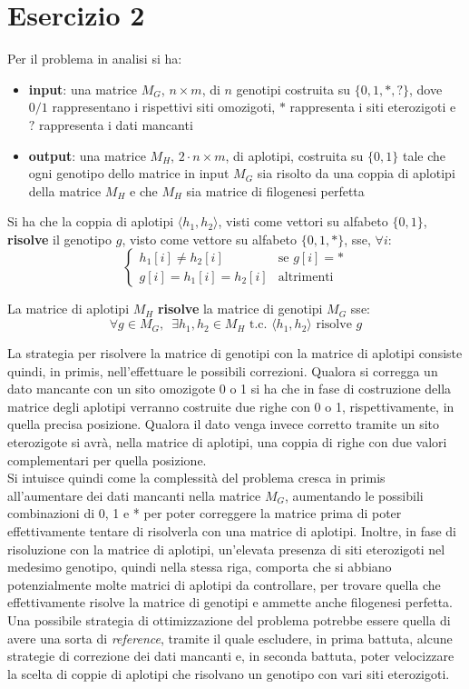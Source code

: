\documentclass[a4paper,12pt, oneside]{book}
\begin{document}
\chapter{Esercizio 2}
Per il problema in analisi si ha:
\begin{itemize}
  \item \textbf{input}: una matrice $M_G$, $n\times m$, di $n$ genotipi
  costruita su $\{0,1,*,?\}$, dove $0/1$ rappresentano i rispettivi siti
  omozigoti, $*$ rappresenta i siti eterozigoti e $?$ rappresenta i dati
  mancanti 
  \item \textbf{output}: una matrice $M_H$, $2\cdot n\times m$, di aplotipi,
  costruita 
  su $\{0,1\}$ tale che ogni genotipo dello matrice in input $M_G$ sia risolto
  da una coppia di aplotipi della matrice $M_H$ e che $M_H$ sia matrice di
  filogenesi perfetta
\end{itemize}
\begin{definizione}
  Si ha che la coppia di aplotipi $\langle h_1,h_2\rangle$, visti come
  vettori su alfabeto $\{0,1\}$, \textbf{risolve} il
  genotipo $g$, visto come vettore su alfabeto $\{0,1,*\}$, sse, $\forall i$:
  \[
    \begin{cases}
      h_1[i]\neq h_2[i]&\mbox{se } g[i]=*\\
      g[i]=h_1[i]=h_2[i]&\mbox{altrimenti}
    \end{cases}
  \]
\end{definizione}
\begin{definizione}
  La matrice di aplotipi $M_H$ \textbf{risolve} la matrice di genotipi $M_G$
  sse:
  \[\forall g\in M_G,\,\,\,\exists h_1,h_2\in
    M_H\mbox{ t.c. }\langle h_1,h_2\rangle \mbox{ risolve } g\]
\end{definizione}
La strategia per risolvere la matrice di genotipi con la matrice di aplotipi
consiste quindi, in primis, nell'effettuare le possibili correzioni. Qualora si
corregga un dato mancante con un sito omozigote 0 o 1 si ha che in fase di
costruzione della matrice degli aplotipi verranno costruite due righe con 0 o 1,
rispettivamente, in quella precisa posizione. Qualora il dato venga invece
corretto tramite un sito eterozigote si avrà, nella matrice di aplotipi, una
coppia di righe con due valori complementari per quella posizione.\\
Si intuisce quindi come la complessità del problema cresca in primis
all'aumentare dei dati mancanti nella matrice $M_G$, aumentando le possibili
combinazioni di 0, 1 e * per poter correggere la matrice prima di poter
effettivamente tentare di risolverla con una matrice di aplotipi. Inoltre, in
fase di risoluzione con la matrice di aplotipi, un'elevata presenza di siti
eterozigoti nel medesimo genotipo, quindi nella stessa riga, comporta che si
abbiano potenzialmente molte matrici di aplotipi da controllare, per trovare
quella che effettivamente risolve la matrice di genotipi e ammette anche
filogenesi perfetta. \\
Una possibile strategia di ottimizzazione del problema potrebbe essere quella di
avere una sorta di \textit{reference}, tramite il quale escludere, in prima
battuta, alcune strategie di correzione dei dati mancanti e, in seconda battuta,
poter velocizzare la scelta di coppie di aplotipi che risolvano un genotipo con
vari siti eterozigoti.
\end{document}
